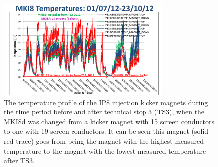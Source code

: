 \begin{figure}
\begin{center}
\includegraphics[width=0.75\textwidth]{LHC_MKI/figures/mki8-temps-post-ts3.png}
\end{center}
\caption{The temperature profile of the IP8 injection kicker magnets during the time period before and after technical stop 3  (TS3), when the MKI8d was changed from a kicker magnet with 15 screen conductors to one with 19 screen conductors. It can be seen this magnet (solid red trace) goes from being the magnet with the highest measured temperature to the magnet with the lowest measured temperature after TS3.}
\label{fig:heating-mki8-post-ts3}
\end{figure}
